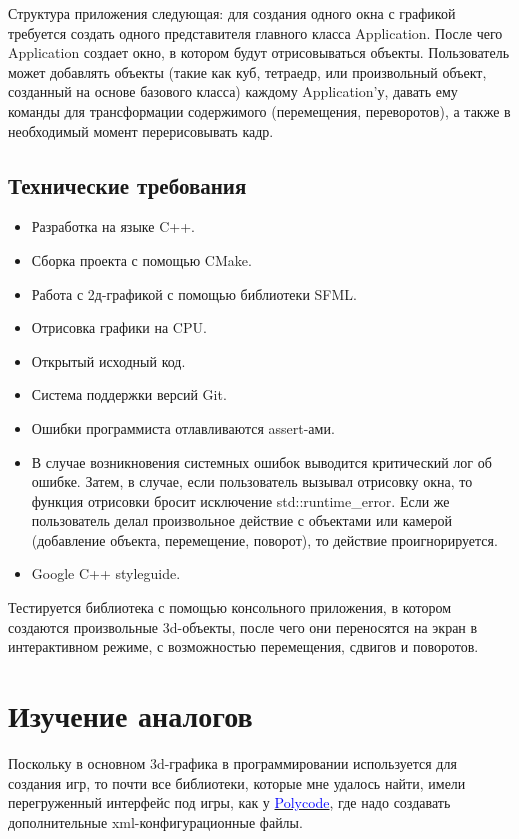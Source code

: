 \documentclass{article}
\begin{document}
Структура приложения следующая: для создания одного окна с графикой требуется создать одного представителя главного класса Application. После чего Application создает окно, в котором будут отрисовываться объекты. Пользователь может добавлять объекты (такие как куб, тетраедр, или произвольный объект, созданный на основе базового класса) каждому Application'у, давать ему команды для трансформации содержимого (перемещения, переворотов), а также в необходимый момент перерисовывать кадр.

\subsection{Технические требования}
\begin{itemize}
\item Разработка на языке C++.
\item Сборка проекта с помощью CMake.
\item Работа с 2д-графикой с помощью библиотеки SFML.
\item Отрисовка графики на CPU.
\item Открытый исходный код.
\item Система поддержки версий Git.
\item Ошибки программиста отлавливаются assert-ами.
\item В случае возникновения системных ошибок выводится критический лог об ошибке. Затем, в случае, если пользователь вызывал отрисовку окна, то функция отрисовки бросит исключение std::runtime\_error. Если же пользователь делал произвольное действие с объектами или камерой (добавление объекта, перемещение, поворот), то действие проигнорируется.
\item Google C++ styleguide.
\end{itemize}

Тестируется библиотека с помощью консольного приложения, в котором создаются произвольные 3d-объекты, после чего они переносятся на экран в интерактивном режиме, с возможностью перемещения, сдвигов и поворотов.

\newpage

\section{Изучение аналогов}

Поскольку в основном 3d-графика в программировании используется для создания игр, то почти все библиотеки, которые мне удалось найти, имели перегруженный интерфейс под игры, как у \href{http://polycode.org/features/}{\textcolor{blue}{Polycode}}, где надо создавать дополнительные xml-конфигурационные файлы.
\end{document}

